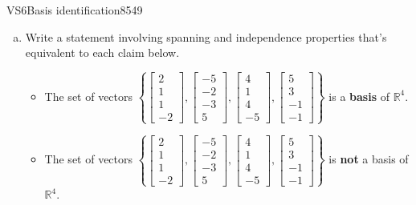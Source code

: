 \begin{exercise}{VS6}{Basis identification}{8549} 
\begin{exerciseStatement} 

\begin{enumerate}[(a)]
\item  

 Write a statement involving spanning and independence properties that's equivalent to each claim below. 

 

\begin{itemize}
\item  

 The set of vectors \(\left\{ \left[\begin{array}{c}
2 \\
1 \\
1 \\
-2
\end{array}\right] , \left[\begin{array}{c}
-5 \\
-2 \\
-3 \\
5
\end{array}\right] , \left[\begin{array}{c}
4 \\
1 \\
4 \\
-5
\end{array}\right] , \left[\begin{array}{c}
5 \\
3 \\
-1 \\
-1
\end{array}\right] \right\}\) is a \textbf{basis} of \(\mathbb{R}^4\). 

 
\item  

 The set of vectors \(\left\{ \left[\begin{array}{c}
2 \\
1 \\
1 \\
-2
\end{array}\right] , \left[\begin{array}{c}
-5 \\
-2 \\
-3 \\
5
\end{array}\right] , \left[\begin{array}{c}
4 \\
1 \\
4 \\
-5
\end{array}\right] , \left[\begin{array}{c}
5 \\
3 \\
-1 \\
-1
\end{array}\right] \right\}\) is \textbf{not} a basis of \(\mathbb{R}^4\). 


\end{itemize}
\end{enumerate}
\end{exerciseStatement}
\end{exercise}
